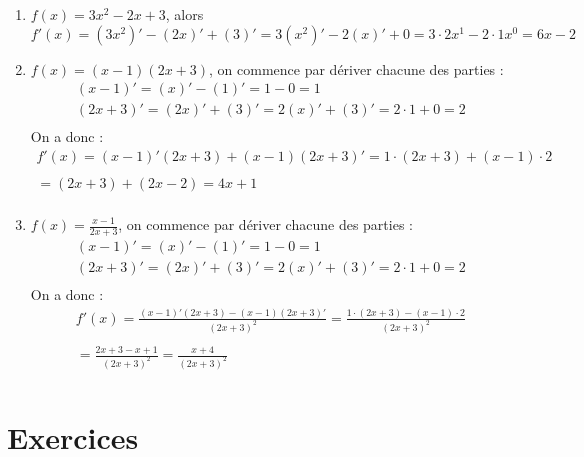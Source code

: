 \begin{exemple}
\begin{enumerate}
\item $f(x) = 3x^2 - 2x +3$, alors
$$
f'(x) = \left(3x^2\right)' - \left(2x\right)' + \left(3\right)'
= 3 \left(x^2\right)' -2\left(x\right)' + 0 = 3\cdot 2x^1 - 2\cdot 1x^0 = 6x-2
$$
\item $f(x) = (x-1)(2x+3)$, on commence par dériver chacune des parties :
$$
\begin{array}{l}
(x-1)' = (x)'-(1)' = 1-0 = 1\\
(2x+3)' = (2x)' + (3)' = 2(x)'+(3)' = 2\cdot 1 + 0 = 2\\
\end{array}
$$
On a donc :
$$
\begin{array}{l}
f'(x) = (x-1)'(2x+3)+(x-1)(2x+3)' = 1\cdot (2x+3)+(x-1)\cdot 2\\ \\ = (2x+3)+(2x-2) = 4x+1\\
\end{array}
$$
\item $f(x) = \frac{x-1}{2x+3}$, on commence par dériver chacune des parties :
$$
\begin{array}{l}
(x-1)' = (x)'-(1)' = 1-0 = 1\\
(2x+3)' = (2x)' + (3)' = 2(x)'+(3)' = 2\cdot 1 + 0 = 2\\
\end{array}
$$
On a donc :
$$
\begin{array}{l}
f'(x) = \frac{(x-1)'(2x+3)-(x-1)(2x+3)'}{(2x+3)^2} = \frac{1\cdot (2x+3)-(x-1)\cdot 2}{(2x+3)^2}\\
\\
 =\frac{2x+3-x+1}{(2x+3)^2}= \frac{x+4}{(2x+3)^2}\\
\end{array}
$$
\end{enumerate}
\end{exemple}

\section{Exercices}

